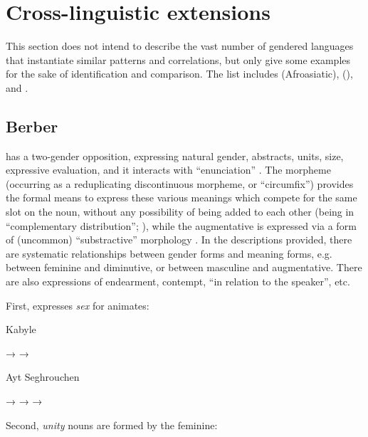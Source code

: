 \section{Cross-linguistic extensions}\label{sec:fassi:extensions}

This section does not intend to describe the vast number of gendered languages
that instantiate similar patterns and correlations, but only give some examples
for the sake of identification and comparison. The list includes 
(Afroasiatic),  (), and .

\subsection{Berber}

 has a two-gender opposition, expressing natural gender, abstracts,
units, size, expressive evaluation, and it interacts with ``enunciation''
\citep{Mettouchi1999}. The morpheme  (occurring as a reduplicating
discontinuous morpheme, or ``circumfix'') provides the formal means to express
these various meanings which compete for the same slot on the noun, without any
possibility of being added to each other (being in ``complementary
distribution''; \citealt{Kossmann2014}), while the augmentative is expressed via
a form of (uncommon) ``substractive'' morphology \citep{Grandi2015}. In the
descriptions provided, there are systematic relationships between gender forms
and meaning forms, e.g. between feminine and diminutive, or between masculine
and augmentative. There are also expressions of endearment, contempt,  ``in
relation to the speaker'', etc.

First,  expresses \emph{sex} for animates:

\begin{exe}
  \ex\label{ex:fassi:51} Kabyle \citep{Mettouchi1999}
  \begin{xlist}
    \ex\label{ex:fassi:51a}  → 
    \ex\label{ex:fassi:51b}  → 
  \end{xlist}
  \ex\label{ex:fassi:52} Ayt Seghrouchen \citep{Kossmann2014}
  \begin{xlist}
    \ex\label{ex:fassi:52a}  → 
    \ex\label{ex:fassi:52b}  → 
    \ex\label{ex:fassi:52c}  →  %
  \end{xlist}
\end{exe}
%
Second, \emph{unity} nouns are formed by the feminine:
\newpage

